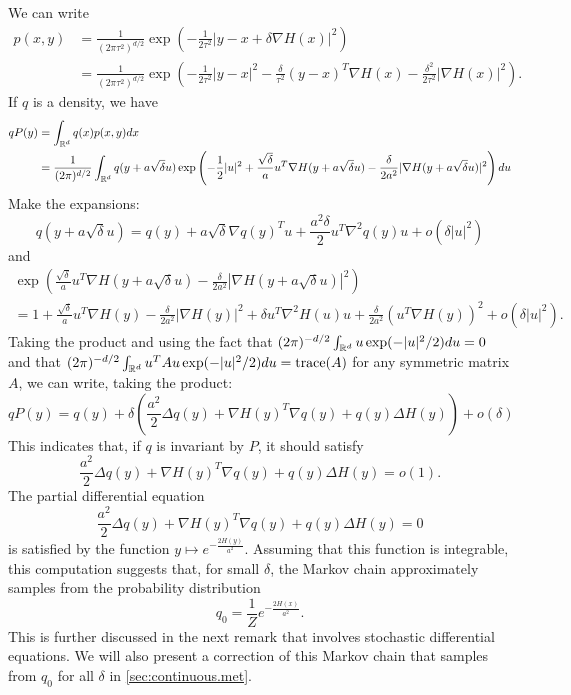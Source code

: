 We can write
\begin{align*}
p(x,y) &= \frac{1}{(2\pi\tau^2)^{d/2}}
 \exp\left(-\frac{1}{2\tau^2} |y - x  +\delta \nabla H(x)|^2\right) \\
 &=  \frac{1}{(2\pi\tau^2)^{d/2}}
 \exp\left(-\frac{1}{2\tau^2} |y - x|^2  -\frac{\delta}{\tau^2} (y-x)^T \nabla H(x) - \frac{\delta^2}{2\tau^2} |\nabla H(x)|^2\right).
\end{align*}
 If $q$ is a density, we have
\begin{align*}
qP(y) &= \int_{{\mathbb{R}}^d} q(x) p(x,y) dx\\ 
&= \frac{1}{(2\pi)^{d/2}} \int_{{\mathbb{R}}^d} q(y +a \sqrt\delta u ) \exp\left(-\frac{1}{2} |u|^2  + \frac{\sqrt\delta}{a} u^T \nabla H(y + a\sqrt\delta  u) - \frac{\delta}{2a^2} |\nabla H(y+a \sqrt\delta  u)|^2\right) du
\end{align*} 
Make the expansions:
\[
q(y +a \sqrt\delta u ) = q(y) + a \sqrt\delta  \nabla q(y)^T u + \frac{a^2\delta}{2} u^T \nabla^2 q(y) u + o(\delta |u|^2)
\]
and
\begin{multline*}
\exp\left( \frac{\sqrt\delta}{a} u^T \nabla H(y + a\sqrt\delta u) - \frac{\delta}{2a^2} |\nabla H(y+a \sqrt\delta u)|^2\right) \\
= 1 + \frac{\sqrt\delta}{a} u^T \nabla H(y) - \frac{\delta}{2a^2} |\nabla H(y)|^2 + \delta u^T \nabla^2 H(u) u + \frac{\delta}{2a^2} (u^T \nabla H(y))^2 + o(\delta |u|^2).
\end{multline*}
Taking the product and using the fact that 
$(2\pi)^{-d/2} \int_{{\mathbb{R}}^d} u \exp(-|u|^2/2)du = 0$ and that 
$(2\pi)^{-d/2} \int_{{\mathbb{R}}^d} u^TAu \exp(-|u|^2/2)du = {\mathrm{trace}}(A)$ for any symmetric matrix $A$, we can write, taking the product:
\[
qP(y) = q(y) + \delta \left(\frac{a^2}{2} \Delta q(y) + \nabla H(y)^T \nabla q(y)  + q(y) \Delta H(y)\right) +o (\delta)
\]  
This indicates that, if $q$ is invariant by $P$, it should satisfy
\[
\frac{a^2}{2} \Delta q(y) + \nabla H(y)^T \nabla q(y)  + q(y) \Delta H(y) = o(1).
\]
The partial differential equation
\begin{equation}
\label{eq:kolm.invariant}
\frac{a^2}{2} \Delta q(y) + \nabla H(y)^T \nabla q(y)  + q(y) \Delta H(y) =0
\end{equation}
is satisfied by the function 
$ y\mapsto e^{-\frac{2H(y)}{a^2}}$. Assuming that this function is integrable, this computation suggests that, for small $\delta$, the Markov chain approximately samples from the probability distribution 
\[
q_0 = \frac{1}{Z}e^{-\frac{2H(x)}{a^2}}.
\]
This is further discussed in the next remark that involves stochastic differential equations. We will also present a correction of this Markov chain that samples from $q_0$ for all $\delta$ in \cref{sec:continuous.met}.

